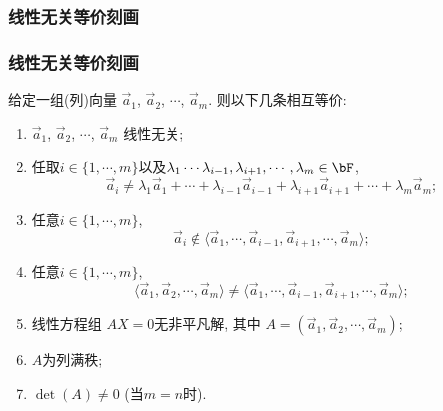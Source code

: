 \subsubsection{线性无关等价刻画}
\begin{frame}\frametitle{线性无关等价刻画}
给定一组(列)向量 $\vec{a}_1$, $\vec{a}_2$, $\cdots$, $\vec{a}_m$. 则以下几条相互等价:
\begin{enumerate}
\item $\vec{a}_1$, $\vec{a}_2$, $\cdots$, $\vec{a}_m$ 线性无关;
\pp
\bigskip

\item 任取$i\in\{1,\cdots,m\}$以及$\lambda_1\cdots\lambda_{i-1},\lambda_{i+1},\cdots,\lambda_m\in \bF$,
\[\vec{a}_i\neq\lambda_1\vec{a}_1 + \cdots+ \lambda_{i-1}\vec{a}_{i-1}  +\lambda_{i+1}\vec{a}_{i+1} + \cdots + \lambda_m\vec{a}_m;\]
\pp
\bigskip

\item 任意$i\in\{1,\cdots,m\}$,
\[\vec{a}_i \notin \langle \vec{a}_1,\cdots,\vec{a}_{i-1},\vec{a}_{i+1},\cdots,\vec{a}_m\rangle;\]
\pp
\bigskip

\item 任意$i\in\{1,\cdots,m\}$,
\[\langle \vec{a}_1,\vec{a}_{2},\cdots,\vec{a}_m\rangle \neq \langle \vec{a}_1,\cdots,\vec{a}_{i-1},\vec{a}_{i+1},\cdots,\vec{a}_m\rangle;\]
\pp
\bigskip

\item 线性方程组 $AX=0$无非平凡解, 其中 $A=(\vec{a}_1,\vec{a}_{2},\cdots,\vec{a}_m)$;
\pp
\bigskip

\item $A$为列满秩;
\pp
\bigskip

\item  $\det(A)\neq 0$ (当$m=n$时).
\end{enumerate}
\end{frame}






